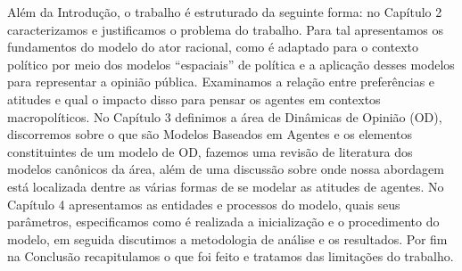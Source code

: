 Além da Introdução, o trabalho é estruturado da seguinte forma: no Capítulo 2
caracterizamos e justificamos o problema do trabalho. Para tal apresentamos os
fundamentos do modelo do ator racional, como é adaptado para o contexto político
por meio dos modelos ``espaciais'' de política e a aplicação desses modelos para
representar a opinião pública. Examinamos a relação entre preferências e
atitudes e qual o impacto disso para pensar os agentes em contextos
macropolíticos. No Capítulo 3 definimos a área de Dinâmicas de Opinião (OD),
discorremos sobre o que são Modelos Baseados em Agentes e os elementos
constituintes de um modelo de OD, fazemos uma revisão de literatura dos modelos
canônicos da área, além de  uma discussão sobre onde nossa abordagem está
localizada dentre as várias formas de se modelar as atitudes de agentes. No
Capítulo 4 apresentamos as entidades e processos do modelo, quais seus
parâmetros, especificamos como é realizada a inicialização e o procedimento do
modelo, em seguida discutimos a metodologia de análise e os resultados. Por fim
na Conclusão recapitulamos o que foi feito e tratamos das limitações do
trabalho.




